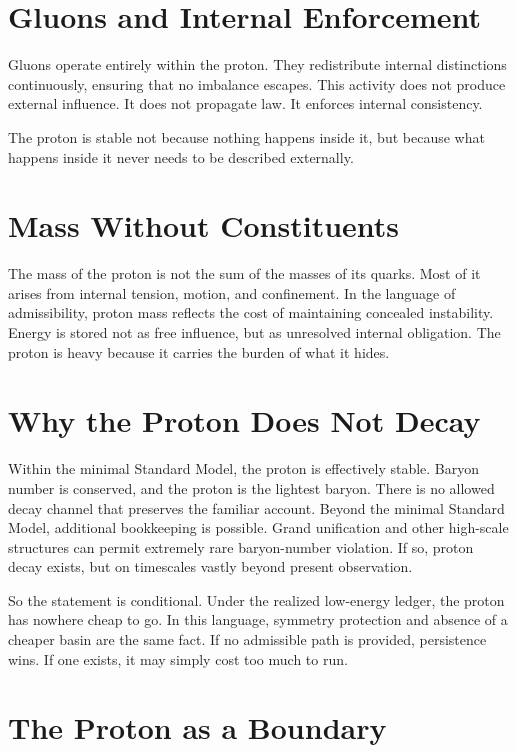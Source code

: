 \documentclass[11pt,twoside,openright]{book}
\begin{document}
\section*{Gluons and Internal Enforcement}

Gluons operate entirely within the proton. They redistribute internal distinctions continuously, ensuring that no imbalance escapes. This activity does not produce external influence. It does not propagate law. It enforces internal consistency.

The proton is stable not because nothing happens inside it, but because what happens inside it never needs to be described externally.

\section*{Mass Without Constituents}

The mass of the proton is not the sum of the masses of its quarks. Most of it arises from internal tension, motion, and confinement. In the language of admissibility, proton mass reflects the cost of maintaining concealed instability. Energy is stored not as free influence, but as unresolved internal obligation. The proton is heavy because it carries the burden of what it hides.

\section*{Why the Proton Does Not Decay}

Within the minimal Standard Model, the proton is effectively stable. Baryon number is conserved, and the proton is the lightest baryon. There is no allowed decay channel that preserves the familiar account. Beyond the minimal Standard Model, additional bookkeeping is possible. Grand unification and other high-scale structures can permit extremely rare baryon-number violation. If so, proton decay exists, but on timescales vastly beyond present observation.

So the statement is conditional. Under the realized low-energy ledger, the proton has nowhere cheap to go. In this language, symmetry protection and absence of a cheaper basin are the same fact. If no admissible path is provided, persistence wins. If one exists, it may simply cost too much to run.

\section*{The Proton as a Boundary}
\end{document}
